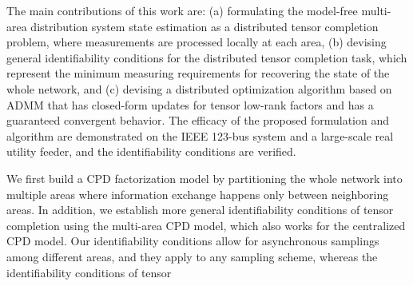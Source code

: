 \documentclass[journal]{IEEEtran}
\newcounter{propose}
\newcounter{thm}
\newcommand{\revision}[1]{{\color{black} #1}} %
\newcommand{\rev}[1]{{\color{black} #1}} %
\begin{document}
 \revision{The main contributions of this work are: \rev{
 (a) formulating the model-free multi-area distribution system state estimation as a distributed tensor completion problem, where measurements are processed locally at each area, (b) devising general identifiability conditions for the distributed tensor completion task, which represent  the minimum measuring requirements for recovering the state of the whole network, and (c) devising a distributed optimization algorithm based on ADMM that has closed-form updates for tensor low-rank factors and has a guaranteed convergent behavior. The efficacy of the proposed formulation and algorithm are demonstrated on the IEEE 123-bus system and a large-scale real utility feeder,  and the identifiability conditions are verified. %
 }
  
 }
 \iffalse
 We first
build a  CPD factorization model by partitioning the whole network into multiple areas where information exchange  happens only between neighboring areas. \revision{In addition, we} establish more general identifiability conditions  of  tensor completion using the multi-area CPD model,  which also works for the centralized CPD model. Our identifiability conditions  allow for asynchronous samplings among different areas, and they apply to any sampling scheme, whereas  the  identifiability conditions  of  tensor
\end{document}
